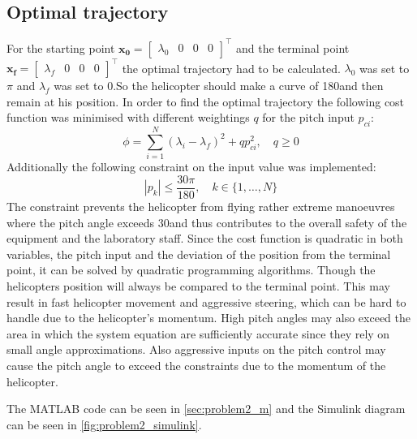 \subsection{Optimal trajectory}\label{sec:prob24}
For the starting point $\mathbf{x_0} = \begin{bmatrix} \lambda_0&0&0&0\end{bmatrix}^\top$ and the terminal point $\mathbf{x_f}=  \begin{bmatrix} \lambda_f&0&0&0\end{bmatrix}^\top$ the optimal trajectory had to be calculated. $\lambda_0$ was set to $\pi$ and $\lambda_f$ was set to $0$.So the helicopter should make a curve of 180\textdegree and then remain at his position. In order to find the optimal trajectory the following cost function was minimised with different weightings $q$ for the pitch input $p_{ci}$:
\begin{equation}
\phi = \displaystyle\sum_{i=1}^{N} (\lambda_i-\lambda_f)^2+qp_{ci}^2, \quad q \geq 0
\end{equation}
Additionally the following constraint on the input value was implemented:
\begin{equation}
	|p_k|\leq \frac {30\pi} {180}, \quad k \in \{1, \dots,N\}
\end{equation}
The constraint prevents the helicopter from flying rather extreme manoeuvres where the pitch angle exceeds 30\textdegree and thus contributes to the overall safety of the equipment and the laboratory staff. Since the cost function is quadratic in both variables, the pitch input and the deviation of the position from the terminal point, it can be solved by quadratic programming algorithms. Though the helicopters position will always be compared to the terminal point. This may result in fast helicopter movement and aggressive steering, which can be hard to handle due to the helicopter's momentum. High pitch angles may also exceed the area in which the system equation are sufficiently accurate since they rely on small angle approximations. Also aggressive inputs on the pitch control may cause the pitch angle to exceed the constraints due to the momentum of the helicopter.

The MATLAB code can be seen in \cref{sec:problem2_m} and the Simulink diagram can be seen in \cref{fig:problem2_simulink}.

